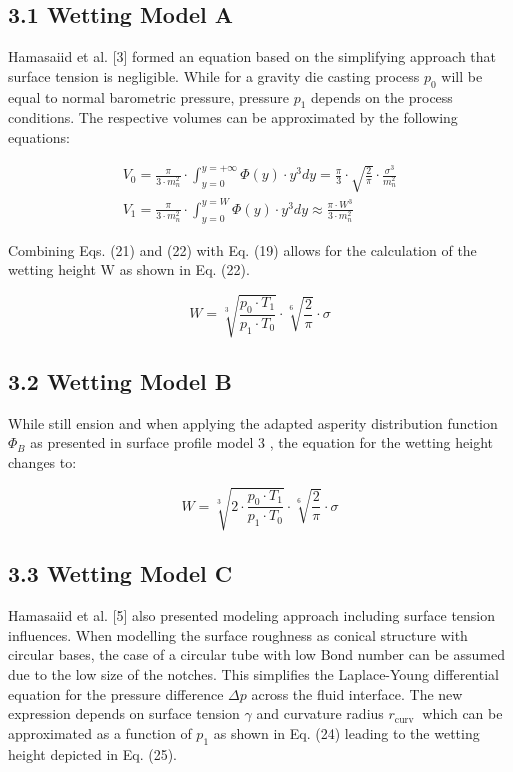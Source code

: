 \documentclass[10pt]{article}
\begin{document}
\subsection*{3.1 Wetting Model A}
Hamasaiid et al. [3] formed an equation based on the simplifying approach that surface tension is negligible. While for a gravity die casting process $p_{0}$ will be equal to normal barometric pressure, pressure $p_{1}$ depends on the process conditions. The respective volumes can be approximated by the following equations:


\begin{gather*}
V_{0}=\frac{\pi}{3 \cdot m_{n}^{2}} \cdot \int_{y=0}^{y=+\infty} \Phi(y) \cdot y^{3} d y=\frac{\pi}{3} \cdot \sqrt{\frac{2}{\pi}} \cdot \frac{\sigma^{3}}{m_{n}^{2}}  \tag{20}\\
V_{1}=\frac{\pi}{3 \cdot m_{n}^{2}} \cdot \int_{y=0}^{y=W} \Phi(y) \cdot y^{3} d y \approx \frac{\pi \cdot W^{3}}{3 \cdot m_{n}^{2}} \tag{21}
\end{gather*}


Combining Eqs. (21) and (22) with Eq. (19) allows for the calculation of the wetting height $\mathrm{W}$ as shown in Eq. (22).


\begin{equation*}
W=\sqrt[3]{\frac{p_{0} \cdot T_{1}}{p_{1} \cdot T_{0}}} \cdot \sqrt[6]{\frac{2}{\pi}} \cdot \sigma \tag{22}
\end{equation*}


\subsection*{3.2 Wetting Model B}
While still ension and when applying the adapted asperity distribution function $\Phi_{B}$ as presented in surface profile model 3 , the equation for the wetting height changes to:


\begin{equation*}
W=\sqrt[3]{2 \cdot \frac{p_{0} \cdot T_{1}}{p_{1} \cdot T_{0}}} \cdot \sqrt[6]{\frac{2}{\pi}} \cdot \sigma \tag{23}
\end{equation*}


\subsection*{3.3 Wetting Model C}
Hamasaiid et al. [5] also presented modeling approach including surface tension influences. When modelling the surface roughness as conical structure with circular bases, the case of a circular tube with low Bond number can be assumed due to the low size of the notches. This simplifies the Laplace-Young differential equation for the pressure difference $\Delta p$ across the fluid interface. The new expression depends on surface tension $\gamma$ and curvature radius $r_{\text {curv }}$ which can be approximated as a function of $p_{1}$ as shown in Eq. (24) leading to the wetting height depicted in Eq. (25).
\end{document}
